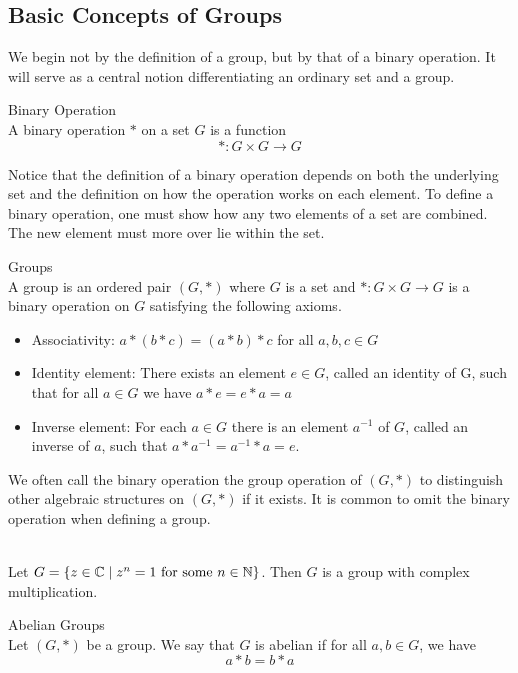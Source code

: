 \documentclass[a4paper]{article}
\begin{document}
\subsection{Basic Concepts of Groups}
We begin not by the definition of a group, but by that of a binary operation. It will serve as a central notion differentiating an ordinary set and a group. 

\begin{defn}{Binary Operation}{}\\
A binary operation $\ast$ on a set $G$ is a function $$\ast:G\times G\to G$$
\end{defn}

Notice that the definition of a binary operation depends on both the underlying set and the definition on how the operation works on each element. To define a binary operation, one must show how any two elements of a set are combined. The new element must more over lie within the set. 

\begin{defn}{Groups}{}\\
A group is an ordered pair $(G,\ast)$ where $G$ is a set and $\ast:G\times G\to G$ is a binary operation on $G$ satisfying the following axioms. 
\begin{itemize}
\item Associativity: $a\ast(b\ast c)=(a\ast b)\ast c$ for all $a,b,c\in G$
\item Identity element: There exists an element $e\in G$, called an identity of G, such that for all $a\in G$ we have $a\ast e=e\ast a=a$
\item Inverse element: For each $a\in G$ there is an element $a^{-1}$ of $G$, called an inverse of $a$, such that $a\ast a^{-1}=a^{-1}\ast a=e$. 
\end{itemize}
\end{defn}

We often call the binary operation the group operation of $(G,\ast)$ to distinguish other algebraic structures on $(G,\ast)$ if it exists. It is common to omit the binary operation when defining a group. 

\begin{eg}{}{}\\
Let $G=\{z\in\mathbb{C}\;|\;z^n=1\text{ for some }n\in\mathbb{N}\}$. Then $G$ is a group with complex multiplication. 
\end{eg}

\begin{defn}{Abelian Groups}{}\\
Let $(G,\ast)$ be a group. We say that $G$ is abelian if for all $a,b\in G$, we have $$a\ast b=b\ast a$$
\end{defn}
\end{document}
